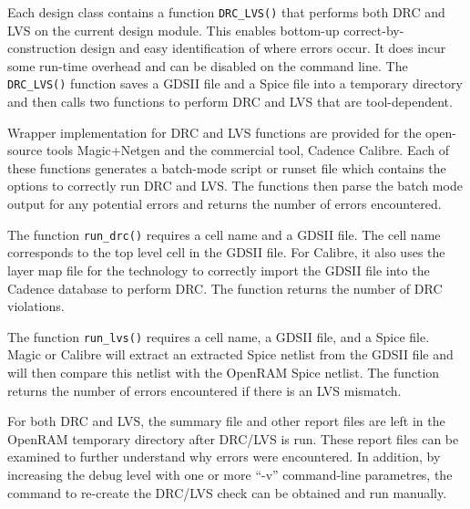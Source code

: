 Each design class contains a function \verb|DRC_LVS()| that performs both
DRC and LVS on the current design module. This enables bottom-up
correct-by-construction design and easy identification of where errors
occur. It does incur some run-time overhead and can be disabled on
the command line. The \verb|DRC_LVS()| function saves a GDSII file and a Spice
file into a temporary directory and then calls two functions to
perform DRC and LVS that are tool-dependent.

Wrapper implementation for DRC and LVS functions are provided for the
open-source tools Magic+Netgen and the commercial tool, Cadence
Calibre.  Each of these functions generates a batch-mode script or runset
file which contains the options to correctly run DRC and LVS. The
functions then parse the batch mode output for any potential errors
and returns the number of errors encountered.

The function \verb|run_drc()| requires a cell name and a GDSII
file. The cell name corresponds to the top level cell in the GDSII
file. For Calibre, it also uses the layer map file for the technology
to correctly import the GDSII file into the Cadence database to
perform DRC. The function returns the number of DRC violations.

The function \verb|run_lvs()| requires a cell name, a GDSII file, and
a Spice file. Magic or Calibre will extract an extracted Spice netlist
from the GDSII file and will then compare this netlist with the
OpenRAM Spice netlist. The function returns the number of errors
encountered if there is an LVS mismatch.


For both DRC and LVS, the summary file and other report files are left
in the OpenRAM temporary directory after DRC/LVS is run. These report
files can be examined to further understand why errors were
encountered. In addition, by increasing the debug level with one or
more ``-v'' command-line parametres, the command to re-create the
DRC/LVS check can be obtained and run manually.





